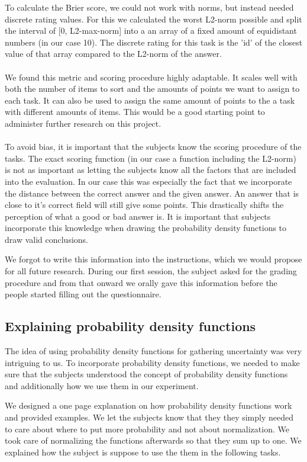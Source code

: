 \documentclass[../main/main.tex]{subfiles}
\begin{document}
	To calculate the Brier score, we could not work with norms, but instead needed discrete rating values. For this we calculated the worst L2-norm possible and split the interval of [0, L2-max-norm] into a an array of a fixed amount of equidistant numbers (in our case 10). The discrete rating for this task is the 'id' of the closest value of that array compared to the L2-norm of the answer.
	\\\\
	We found this metric and scoring procedure highly adaptable. It scales well with both the number of items to sort and the amounts of points we want to assign to each task. It can also be used to assign the same amount of points to the a task with different amounts of items. This would be a good starting point to administer further research on this project.
	\\\\
	To avoid bias, it is important that the subjects know the scoring procedure of the tasks. The exact scoring function (in our case a function including the L2-norm) is not as important as letting the subjects know all the factors that are included into the evaluation. In our case this was especially the fact that we incorporate the distance between the correct answer and the given answer. An answer that is close to it's correct field will still give some points. This drastically shifts the perception of what a good or bad answer is. It is important that subjects incorporate this knowledge when drawing the probability density functions to draw valid conclusions.
	
	We forgot to write this information into the instructions, which we would propose for all future research. During our first session, the subject asked for the grading procedure and from that onward we orally gave this information before the people started filling out the questionnaire.
	
	\subsection{Explaining probability density functions}
	
	The idea of using probability density functions for gathering uncertainty was very intriguing to us. To incorporate probability density functions, we needed to make sure that the subjects understood the concept of probability density functions and additionally how we use them in our experiment. 
	
	We designed a one page explanation on how probability density functions work and provided examples. We let the subjects know that they they simply needed to care about where to put more probability and not about normalization. We took care of normalizing the functions afterwards so that they sum up to one. We explained how the subject is suppose to use the them in the following tasks.
	
\end{document}
